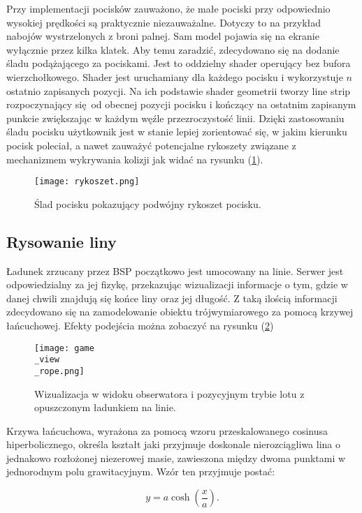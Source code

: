 Przy implementacji pocisków zauważono, że małe pociski przy odpowiednio wysokiej prędkości są praktycznie niezauważalne. Dotyczy to na przykład nabojów wystrzelonych z broni palnej. Sam model pojawia się na ekranie wyłącznie przez kilka klatek. Aby temu zaradzić, zdecydowano się na dodanie śladu podążającego za pociskami. Jest to oddzielny shader operujący bez bufora wierzchołkowego. Shader jest uruchamiany dla każdego pocisku i wykorzystuje $n$ ostatnio zapisanych pozycji. Na ich podstawie shader geometrii tworzy line strip rozpoczynający się od obecnej pozycji pocisku i kończący na ostatnim zapisanym punkcie zwiększając w każdym węźle przezroczystość linii. Dzięki zastosowaniu śladu pocisku użytkownik jest w stanie lepiej zorientować się, w jakim kierunku pocisk poleciał, a nawet zauważyć potencjalne rykoszety związane z mechanizmem wykrywania kolizji jak widać na rysunku (\ref{rykoszet}).

\begin{figure}[h]
	\centering
	\texttt{[image: rykoszet.png]}
	\caption{Ślad pocisku pokazujący podwójny rykoszet pocisku.}
	\label{rykoszet}
\end{figure}

\subsection{Rysowanie liny}

Ładunek zrzucany przez BSP początkowo jest umocowany na linie. Serwer jest odpowiedzialny za jej fizykę, przekazując wizualizacji informacje o tym, gdzie w danej chwili znajdują się końce liny oraz jej długość. Z taką ilością informacji zdecydowano się na zamodelowanie obiektu trójwymiarowego za pomocą krzywej łańcuchowej. Efekty podejścia można zobaczyć na rysunku (\ref{gui_game4})
\\

\begin{figure}[!h]
	\centering
	\texttt{[image: game\\\_view\\\_rope.png]}
	\caption{Wizualizacja w widoku obserwatora i pozycyjnym trybie lotu z opuszczonym ładunkiem na linie.}
	\label{gui_game4}
\end{figure}
\newpage
Krzywa łańcuchowa, wyrażona za pomocą wzoru przeskalowanego cosinusa hiperbolicznego, określa kształt jaki przyjmuje doskonale nierozciągliwa lina o jednakowo rozłożonej niezerowej masie, zawieszona między dwoma punktami w jednorodnym polu grawitacyjnym. Wzór ten przyjmuje postać:

\[
	y = a \cosh \left( \frac{x}{a} \right).
\]

